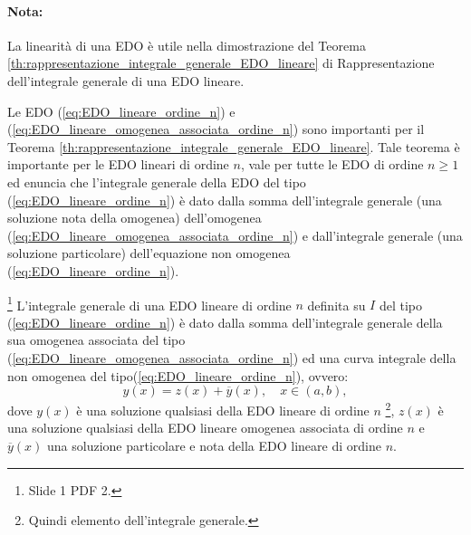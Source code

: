\paragraph{Nota:} La linearità di una EDO è utile nella dimostrazione del Teorema \ref{th:rappresentazione_integrale_generale_EDO_lineare} di Rappresentazione dell'integrale generale di una EDO lineare.

Le EDO (\ref{eq:EDO_lineare_ordine_n}) e (\ref{eq:EDO_lineare_omogenea_associata_ordine_n}) sono importanti per il Teorema \ref{th:rappresentazione_integrale_generale_EDO_lineare}. Tale teorema è importante per le EDO lineari di ordine $n$, vale per tutte le EDO di ordine $n\geq 1$ ed enuncia che l'integrale generale della EDO del tipo (\ref{eq:EDO_lineare_ordine_n}) è dato dalla somma dell'integrale generale (una soluzione nota della omogenea) dell'omogenea (\ref{eq:EDO_lineare_omogenea_associata_ordine_n}) e dall'integrale generale (una soluzione particolare) dell'equazione non omogenea (\ref{eq:EDO_lineare_ordine_n}).

\begin{theorem}\label{th:rappresentazione_integrale_generale_EDO_lineare}\footnote{Slide 1 PDF 2.}
    L'integrale generale di una EDO lineare di ordine $n$ definita su $I$ del tipo (\ref{eq:EDO_lineare_ordine_n}) è dato dalla somma dell'integrale generale della sua omogenea associata del tipo (\ref{eq:EDO_lineare_omogenea_associata_ordine_n}) ed una curva integrale della non omogenea  del tipo(\ref{eq:EDO_lineare_ordine_n}), ovvero:
    \begin{equation}\label{eq:rappresentazione_integrale_generale_EDO_lineare}
        y(x)=z(x)+\overline{y}(x),\quad x\in(a,b),
    \end{equation}
    dove $y(x)$ è una soluzione qualsiasi della EDO lineare di ordine $n$ \footnote{Quindi elemento dell'integrale generale.}, $z(x)$ è una soluzione qualsiasi della EDO lineare omogenea associata di ordine $n$ e $\overline{y}(x)$ una soluzione particolare e nota della EDO lineare di ordine $n$. 
\end{theorem} 

